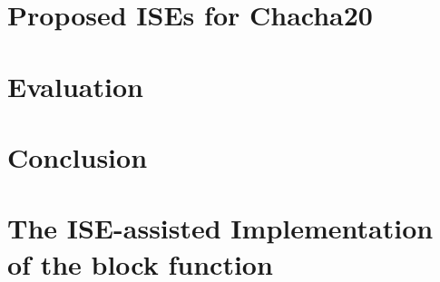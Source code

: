 \documentclass[preprint]{iacrtrans}
\begin{document}
\section{Proposed ISEs for Chacha20}
\label{sec:ise}


\section{Evaluation}
\label{sec:res}


\section{Conclusion}
\label{sec:outro}







\appendix

\newpage
\section{The ISE-assisted Implementation of the block function}
\label{appx:ISE-assisted Implementation}
\lstset{style=mystyle}

\end{document}
